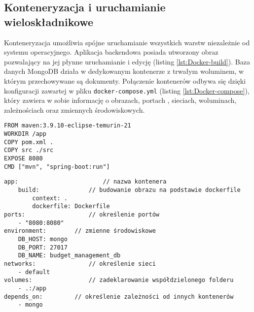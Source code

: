 \subsection{Konteneryzacja i uruchamianie wieloskładnikowe}
Konteneryzacja umożliwia spójne uruchamianie wszystkich warstw niezależnie od systemu operacyjnego. Aplikacja backendowa posiada utworzony obraz pozwalający na jej płynne uruchamianie i edycję (listing \ref{lst:Docker-build}). Baza danych MongoDB działa w dedykowanym kontenerze z trwałym woluminem, w którym przechowywane są dokumenty. Połączenie kontenerów odbywa się dzięki konfiguracji zawartej w pliku \texttt{docker-compose.yml} (listing \ref{lst:Docker-compose}), który zawiera w sobie informację o obrazach, portach , sieciach, woluminach, zależnościach oraz zmiennych środowiskowych.
\begin{lstlisting}[caption={Budowanie obrazu - Dockerfile}, label={lst:Docker-build}]
FROM maven:3.9.10-eclipse-temurin-21
WORKDIR /app
COPY pom.xml .
COPY src ./src
EXPOSE 8080
CMD ["mvn", "spring-boot:run"]
\end{lstlisting}
\begin{lstlisting}[caption={Fragment pliku konfiguracyjnego compose.yml}, label={lst:Docker-compose}]
app:						// nazwa kontenera
	build:				// budowanie obrazu na podstawie dockerfile
		context: .
		dockerfile: Dockerfile
ports:					// określenie portów
	- "8080:8080"
environment:		// zmienne środowiskowe
	DB_HOST: mongo
	DB_PORT: 27017
	DB_NAME: budget_management_db
networks:				// określenie sieci
	- default
volumes:				// zadeklarowanie współdzielonego folderu 
	- .:/app
depends_on:			// określenie zależności od innych kontenerów
	- mongo
\end{lstlisting}